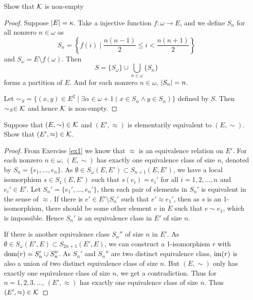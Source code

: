 \documentclass[11pt]{article}
\begin{document}
\begin{exercise}
Show that \(\mathcal{K}\) is non-empty
\end{exercise}

\begin{proof}
Suppose \(\abs{E}=\kappa\). Take a injective function \(f:\omega\to E\), and we define \(S_n\) for all nonzero \(n\in\omega\)
as
\begin{equation*}
S_n=\left\{f(i)\mid \frac{n(n-1)}{2}\le i<\frac{n(n+1)}{2}\right\}
\end{equation*}
and \(S_\omega=E\setminus f(\omega)\). Then
\begin{equation*}
S=\{S_\omega\}\cup\bigcup_{n\in\omega}\{S_n\}
\end{equation*}
forms a partition of \(E\). And for each nonzero \(n\in\omega\), \(\abs{S_n}=n\).

Let \(\sim_S=\{(x,y)\in E^2\mid \exists \alpha\in\omega+1(x\in S_\alpha\wedge y\in S_\alpha)\}\) defined by \(S\). Then
\(\sim_S\in\mathcal{K}\) and hence \(\mathcal{K}\) is non-empty.
\end{proof}

\begin{exercise}
Suppose that \((E,\sim)\in\mathcal{K}\) and \((E',\approx)\) is elementarily equivalent to \((E,\sim)\). Show
that \((E',\approx)\in\mathcal{K}\).
\end{exercise}

\begin{proof}
From Exercise \ref{ex1} we know that \(\approx\) is an equivalence relation on \(E'\). For each
nonzero \(n\in\omega\), \((E,\sim)\) has exactly one equivalence class of size \(n\), denoted by \(S_n=\{e_1,\dots,e_n\}\).
As \(\emptyset\in S_\omega(E,E')\subset S_{n+1}(E,E')\), we have a local isomorphism \(s\in S_1(E,E')\) such
that \(s(e_i)=e_i'\) for all \(i=1,2,\dots,n\) and \(e_i'\in E'\). Let \(S_n'=\{e_1',\dots,e_n'\}\), then each pair
of elements in \(S_n'\) is equivalent in the sense of \(\approx\). If there is \(e'\in E'\setminus S_n'\) such
that \(e'\approx e_1'\), then as \(s\) is an 1-isomorphism, there should be some other element \(e\)
in \(E\) such that \(e\sim e_1\), which is impossible. Hence \(S_n'\) is an equivalence class in \(E'\)
of size \(n\).

If there is another equivalence class \(S_n''\) of size \(n\) in \(E'\).
As \(\emptyset\in S_\omega(E',E)\subset S_{2n+1}(E',E)\), we can construct a 1-isomorphism \(r\)
with \(\operatorname{dom}(r)=S_n'\cup S_n''\). As \(S_n'\) and \(S_n''\) are two distinct equivalence
class, \(\operatorname{im}(r)\) is also a union of two distinct equivalence class of size \(n\). But \((E,\sim)\)
only has exactly one equivalence class of size \(n\), we get a contradiction. Thus
for \(n=1,2,3,\dots\), \((E',\approx)\) has exactly one equivalence class of size \(n\). Thus \((E',\approx)\in\mathcal{K}\)
\end{proof}
\end{document}

